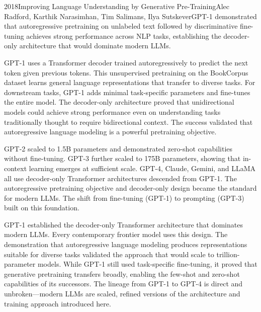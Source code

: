 
\begin{papersummary}{2018}{Improving Language Understanding by Generative Pre-Training}{Alec Radford, Karthik Narasimhan, Tim Salimans, Ilya Sutskever}{GPT-1 demonstrated that autoregressive pretraining on unlabeled text followed by discriminative fine-tuning achieves strong performance across NLP tasks, establishing the decoder-only architecture that would dominate modern LLMs.}

GPT-1 uses a Transformer decoder trained autoregressively to predict the next token given previous tokens. This unsupervised pretraining on the BookCorpus dataset learns general language representations that transfer to diverse tasks. For downstream tasks, GPT-1 adds minimal task-specific parameters and fine-tunes the entire model. The decoder-only architecture proved that unidirectional models could achieve strong performance even on understanding tasks traditionally thought to require bidirectional context. The success validated that autoregressive language modeling is a powerful pretraining objective.

GPT-2 scaled to 1.5B parameters and demonstrated zero-shot capabilities without fine-tuning. GPT-3 further scaled to 175B parameters, showing that in-context learning emerges at sufficient scale. GPT-4, Claude, Gemini, and LLaMA all use decoder-only Transformer architectures descended from GPT-1. The autoregressive pretraining objective and decoder-only design became the standard for modern LLMs. The shift from fine-tuning (GPT-1) to prompting (GPT-3) built on this foundation.

GPT-1 established the decoder-only Transformer architecture that dominates modern LLMs. Every contemporary frontier model uses this design. The demonstration that autoregressive language modeling produces representations suitable for diverse tasks validated the approach that would scale to trillion-parameter models. While GPT-1 still used task-specific fine-tuning, it proved that generative pretraining transfers broadly, enabling the few-shot and zero-shot capabilities of its successors. The lineage from GPT-1 to GPT-4 is direct and unbroken—modern LLMs are scaled, refined versions of the architecture and training approach introduced here.

\end{papersummary}

